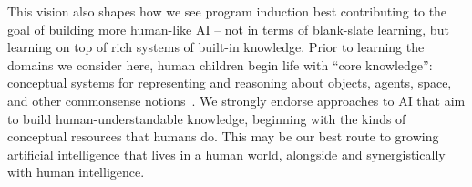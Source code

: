 \documentclass[12pt]{article}
\begin{document}
This vision also shapes how we see program induction best contributing to the goal %
of building more human-like AI -- not in terms of blank-slate learning, but learning on top of rich systems of built-in knowledge. Prior to learning the domains 
we consider here, human children begin life with ``core knowledge'': %
conceptual systems for representing and reasoning about objects, agents, space, and other commonsense notions~\cite{lake2017bbs, spelke1992origins, carey2011origin}.  We strongly endorse approaches to AI that aim to build human-understandable knowledge, beginning with the kinds of conceptual resources that humans do. %
This may be our best route to growing artificial intelligence that lives in a human world, alongside and synergistically with human intelligence.


\end{document}
